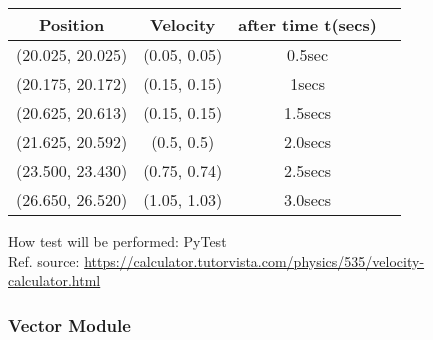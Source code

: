 \documentclass[12pt, titlepage]{article}
\begin{document}
\begin{enumerate}
\begin{table} [h!]
\begin{tabular}{|c|c|c|c}
		\hline	
		
	\textbf{Position} &\textbf{Velocity} & \textbf{after time t(secs)}\\
	\hline 

	\hline(20.025, 20.025)& (0.05, 0.05)& 0.5sec \\ \hline
		
    (20.175, 20.172)& (0.15, 0.15)& 1secs \\ \hline
		
	(20.625, 20.613)& (0.15, 0.15)& 1.5secs \\ \hline
		
    (21.625, 20.592)& (0.5, 0.5)& 2.0secs \\ \hline
		
	(23.500, 23.430)& (0.75, 0.74)& 2.5secs \\ \hline
	
	(26.650, 26.520)& (1.05, 1.03)& 3.0secs \\ \hline
		
	\end{tabular}
	
	
\end{table}
How test will be performed: PyTest\\

Ref. source: \url{https://calculator.tutorvista.com/physics/535/velocity-calculator.html}


\end{enumerate}

\subsubsection{Vector Module}
\end{document}
